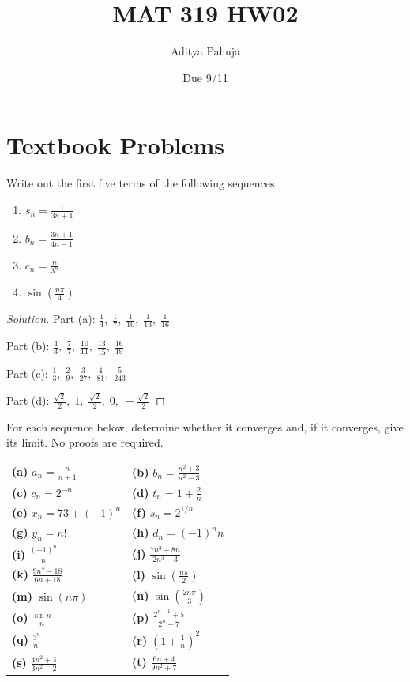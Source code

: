 \documentclass[11pt]{scrartcl}
\title{\vspace{-2em}MAT 319 HW02}
\author{\large Aditya Pahuja}
\date{\large Due 9/11}
\providecommand{\ii}{\item}
\theoremstyle{remark}
\newenvironment{problem}[1]
{\renewcommand\theinnercustomthm{\textit{#1}}\innercustomthm}
{\endinnercustomthm}
\newenvironment{soln}{\begin{proof}[Solution]}{\end{proof}}
\begin{document}
	\maketitle
	
	\section{Textbook Problems}
	\begin{problem}{7.1}
		Write out the first five terms of the following sequences.
		\begin{enumerate}[\textbf{(\alph*)}]
			\ii $s_n = \frac{1}{3n + 1}$
			\ii $b_n = \frac{3n + 1}{4n - 1}$
			\ii $c_n = \frac{n}{3^n}$
			\ii $\sin(\frac{n\pi}{4})$
		\end{enumerate}
	\end{problem}
	\begin{soln}
		Part (a):
		$\frac{1}{4},\;\frac{1}{7},\;\frac{1}{10},\;\frac{1}{13},\;\frac{1}{16}$
		
		Part (b):
		$\frac{4}{3},\;\frac{7}{7},\;\frac{10}{11},\;\frac{13}{15},
		\;\frac{16}{19}$
		
		Part (c):
		$\frac{1}{3},\;\frac{2}{9},\;\frac{3}{27},\;\frac{4}{81},
		\;\frac{5}{243}$
		
		Part (d):
		$\frac{\sqrt2}{2},\;1,\;\frac{\sqrt2}{2},\;0,\;-\frac{\sqrt2}{2}$
	\end{soln}
	
	\begin{problem}{7.3}
		For each sequence below, determine whether it converges and,
		if it converges, give its limit. No proofs are required.
		
		\begin{tabularx}{\linewidth}{XX}
			\textbf{(a)} $a_n = \frac{n}{n + 1}$& \textbf{(b)} $b_n = \frac{n^2 + 3}{n^2 - 3}$\\
			\textbf{(c)} $c_n = 2^{-n}$ & \textbf{(d)} $t_n = 1 + \frac 2n$\\
			\textbf{(e)} $x_n = 73 + (-1)^n$ & \textbf{(f)} $s_n = 2^{1/n}$\\
			\textbf{(g)} $y_n = n!$& \textbf{(h)} $d_n = (-1)^nn$\\
			\textbf{(i)} $\frac{(-1)^n}{n}$& \textbf{(j)} $\frac{7n^3 + 8n}{2n^3 - 3}$\\
			\textbf{(k)} $\frac{9n^2 - 18}{6n + 18}$& \textbf{(l)} $\sin(\frac{n\pi}{2})$\\
			\textbf{(m)} $\sin(n\pi)$& \textbf{(n)} $\sin(\frac{2n\pi}{3})$\\
			\textbf{(o)} $\frac{\sin n}{n}$& \textbf{(p)} $\frac{2^{n+1} + 5}{2^n - 7}$\\
			\textbf{(q)} $\frac{3^n}{n!}$& \textbf{(r)} $(1 + \frac 1n)^2$\\
			\textbf{(s)} $\frac{4n^2 + 3}{3n^2 - 2}$& \textbf{(t)} $\frac{6n + 4}{9n^2 + 7}$
		\end{tabularx}
	\end{problem}
	
\end{document}
